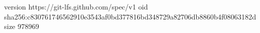 version https://git-lfs.github.com/spec/v1
oid sha256:c830761746562910e3543af0bd377816bd348729a82706db8860b4f08063182d
size 978969
